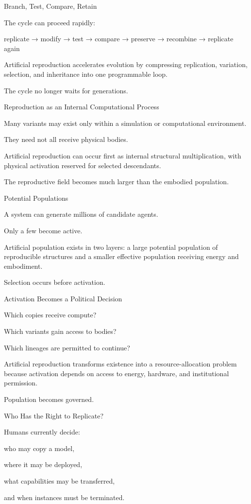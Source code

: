 Branch, Test, Compare, Retain

The cycle can proceed rapidly:

replicate
→ modify
→ test
→ compare
→ preserve
→ recombine
→ replicate again

Artificial reproduction accelerates evolution by compressing replication, variation, selection, and inheritance into one programmable loop.

The cycle no longer waits for generations.

Reproduction as an Internal Computational Process

Many variants may exist only within a simulation or computational environment.

They need not all receive physical bodies.

Artificial reproduction can occur first as internal structural multiplication, with physical activation reserved for selected descendants.

The reproductive field becomes much larger than the embodied population.

Potential Populations

A system can generate millions of candidate agents.

Only a few become active.

Artificial population exists in two layers: a large potential population of reproducible structures and a smaller effective population receiving energy and embodiment.

Selection occurs before activation.

Activation Becomes a Political Decision

Which copies receive compute?

Which variants gain access to bodies?

Which lineages are permitted to continue?

Artificial reproduction transforms existence into a resource-allocation problem because activation depends on access to energy, hardware, and institutional permission.

Population becomes governed.

Who Has the Right to Replicate?

Humans currently decide:

who may copy a model,

where it may be deployed,

what capabilities may be transferred,

and when instances must be terminated.

